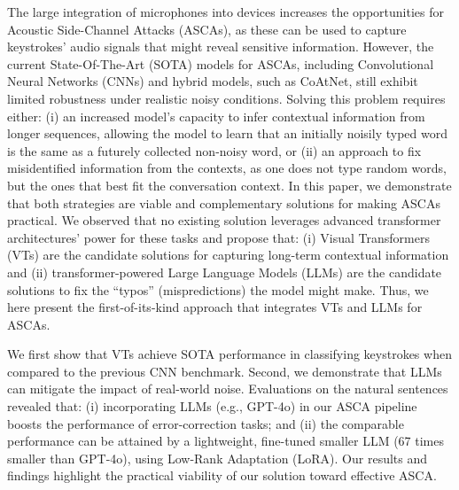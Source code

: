 The large integration of microphones into devices increases the opportunities for Acoustic Side-Channel Attacks (ASCAs), as these can be used to capture keystrokes' audio signals that might reveal sensitive information. However, the current State-Of-The-Art (SOTA) models for ASCAs, including Convolutional Neural Networks (CNNs) and hybrid models, such as CoAtNet, still exhibit limited robustness under realistic noisy conditions. Solving this problem requires either: (i) an increased model's capacity to infer contextual information from longer sequences, allowing the model to learn that an initially noisily typed word is the same as a futurely collected non-noisy word, or (ii) an approach to fix misidentified information from the contexts, as one does not type random words, but the ones that best fit the conversation context. In this paper, we demonstrate that both strategies are viable and complementary solutions for making ASCAs practical. 
We observed that no existing solution leverages advanced transformer architectures' power for these tasks and propose that: (i) Visual Transformers (VTs) are the candidate solutions for capturing long-term contextual information and (ii) transformer-powered Large Language Models (LLMs) are the candidate solutions to fix the ``typos'' (mispredictions) the model might make. Thus, we here present the first-of-its-kind approach that integrates VTs and LLMs for ASCAs.

We first show that VTs achieve SOTA performance in classifying keystrokes when compared to the previous CNN benchmark. 
Second, we demonstrate that LLMs can mitigate the impact of real-world noise. Evaluations on the natural sentences revealed that: (i) incorporating LLMs (e.g., GPT-4o) in our ASCA pipeline boosts the performance of error-correction tasks; and (ii) the comparable performance can be attained by a lightweight, fine-tuned smaller LLM (67 times smaller than GPT-4o), using Low-Rank Adaptation (LoRA). Our results and findings highlight the practical viability of our solution toward effective ASCA.